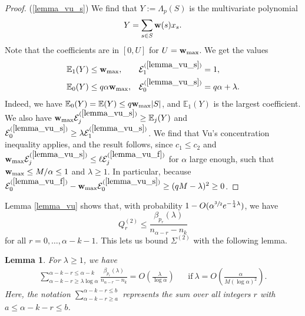 \documentclass{article}
\theoremstyle{plain}
\theoremstyle{remark}
\theoremstyle{plain}
\newtheorem{lemma}[theorem]{Lemma}
\numberwithin{equation}{section}
\renewcommand{\b}{{\bf{w}}}
\begin{document}
\begin{proof}
		(\ref{lemma_vu_s}) We find that $Y:=\Lambda_p(S)$ is the multivariate polynomial $$Y=\sum_{s\in S}\b(s)x_s.$$ Note that the coefficients are in $[0,U]$ for $U=\b_{\max}$. We get the values
		\begin{align}
			\mathbb{E}_1(Y)&\leq\b_{\max},&\mathcal{E}_1^{(\ref{lemma_vu_s})}&=1,
			\\\mathbb{E}_0(Y)&\leq q\alpha\b_{\max},&\mathcal{E}_0^{(\ref{lemma_vu_s})}&=q\alpha+\lambda.
		\end{align}
		Indeed, we have $\mathbb{E}_0(Y)=\mathbb{E}(Y)\leq q\b_{\max}|S|$, and $\mathbb{E}_1(Y)$ is the largest coefficient. We also have $\b_{\max}\mathcal{E}_j^{(\ref{lemma_vu_s})}\geq\mathbb{E}_j(Y)$ and $\mathcal{E}_0^{(\ref{lemma_vu_s})}\geq\lambda\mathcal{E}_1^{(\ref{lemma_vu_s})}$. We find that Vu's concentration inequality applies, and the result follows, since $c_1\leq c_2$ and $\b_{\max}\mathcal{E}_j^{(\ref{lemma_vu_s})}\leq\ell\mathcal{E}_j^{(\ref{lemma_vu_f})}$ for $\alpha$ large enough, such that $\b_{\max}\leq M/\alpha\leq1$ and $\lambda\geq1$. In particular, because $\mathcal{E}_0^{(\ref{lemma_vu_f})}-\b_{\max}\mathcal{E}_0^{(\ref{lemma_vu_s})}\geq(qM-\lambda)^2\geq0$.
	\end{proof}
	
	Lemma \ref{lemma_vu} shows that, with probability $1-O(\alpha^{\sfrac32}e^{-\frac14\lambda})$, we have $$Q_r^{(2)}\leq\frac{\beta_{p_r}(\lambda)}{n_{\alpha-r}-n_k}$$ for all $r=0,\ldots,\alpha-k-1$. This lets us bound $\Sigma^{(2)}$ with the following lemma.
	
	\begin{lemma}\label{lemma_sum}
		For $\lambda\geq1$, we have
		\begin{align}
			\sum_{\alpha-k-r\geq\lambda\log\alpha}^{\alpha-k-r\leq\alpha-k}\frac{\beta_{p_r}(\lambda)}{n_{\alpha-r}-n_k}=O\left(\frac{\lambda}{\log\alpha}\right)&&\text{if}\ \lambda=O\left(\frac{\alpha}{M(\log\alpha)^2}\right).
		\end{align}
		Here, the notation $\sum_{\alpha-k-r\geq a}^{\alpha-k-r\leq b}$ represents the sum over all integers $r$ with $a\leq\alpha-k-r\leq b$.
	\end{lemma}
	
\end{document}

